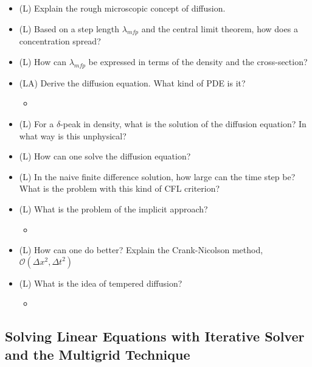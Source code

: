 \begin{itemize}
    \item (L) Explain the rough microscopic concept of diffusion.
    \answerboxM
    \item (L) Based on a step length $\lambda_{mfp}$ and the central limit theorem, how does a concentration spread?
    \answerboxL
    \item (L) How can $\lambda_{mfp}$ be expressed in terms of the density and the cross-section?
    \answerboxM
    \item (LA) Derive the diffusion equation. What kind of PDE is it?
    \begin{itemize}
        \item {}
    \end{itemize}
    \answerboxL
    \item (L) For a $\delta$-peak in density, what is the solution of the diffusion equation? In what way is this unphysical?
    \answerboxM
    \item (L) How can one solve the diffusion equation?
    \answerboxM
    \item (L) In the naive finite difference solution, how large can the time step be? What
    is the problem with this kind of CFL criterion?
    \answerboxL
    \item (L) What is the problem of the implicit approach?
    \begin{itemize}
        \item {}
    \end{itemize}
    \answerboxM
    \item (L) How can one do better? Explain the Crank-Nicolson method, $\mathcal{O}(\Delta x^2, \Delta t^2)$
    \answerboxM
    \item (L) What is the idea of tempered diffusion?
    \begin{itemize}
        \item {}
    \end{itemize}
    \answerboxM
\end{itemize}

\subsection*{Solving Linear Equations with Iterative Solver and the Multigrid Technique}

